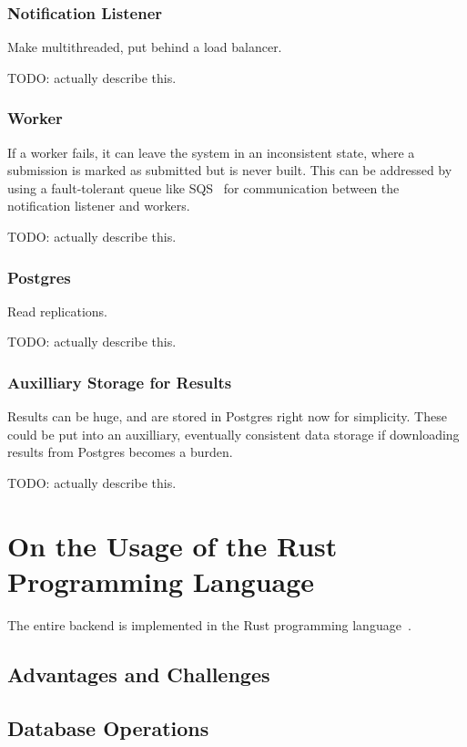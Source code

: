 \documentclass{scrartcl}
\begin{document}
\subsubsection{Notification Listener}
Make multithreaded, put behind a load balancer.

TODO: actually describe this.
\subsubsection{Worker}
If a worker fails, it can leave the system in an inconsistent state, where a submission is marked as submitted but is never built.
This can be addressed by using a fault-tolerant queue like SQS~\cite{sqs} for communication between the notification listener and workers.

TODO: actually describe this.
\subsubsection{Postgres}
Read replications.

TODO: actually describe this.

\subsubsection{Auxilliary Storage for Results}
Results can be huge, and are stored in Postgres right now for simplicity.
These could be put into an auxilliary, eventually consistent data storage if downloading results from Postgres becomes a burden.

TODO: actually describe this.

\section{On the Usage of the Rust Programming Language}
The entire backend is implemented in the Rust programming language~\cite{rust}.

\subsection{Advantages and Challenges}
\subsection{Database Operations}

{}

\end{document}
